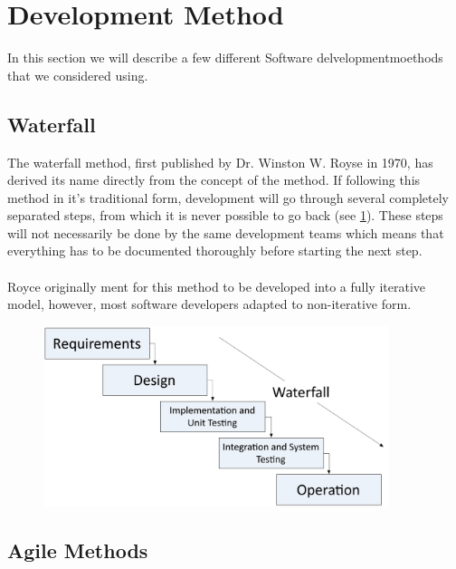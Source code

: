 \section{Development Method}
\label{sec:DevelopmentMethods}
In this section we will describe a few different Software delvelopmentmoethods that we considered using.

\subsection{Waterfall}
The waterfall method, first published by Dr. Winston W. Royse in 1970, has derived its name directly from the concept of the method. If following this method in it's traditional form, development will go through several completely separated steps, from which it is never possible to go back (see \ref{fig:WaterfallPic}). These steps will not necessarily be done by the same development teams which means that everything has to be documented thoroughly before starting the next step.\\
 \\
Royce originally ment for this method to be developed into a fully iterative model, however, most software developers adapted to non-iterative form.
\cite{waterfallroyce}

\begin{figure}[H]
	\centering
		\includegraphics[width=0.90\textwidth]{input/implementation/development/waterfall.pdf}
	\label{fig:WaterfallPic}
\end{figure}

\subsection{Agile Methods}